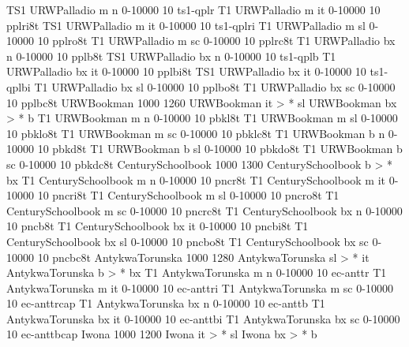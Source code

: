 \declarefont TS1 URWPalladio m   n  0-10000   10 ts1-qplr
\declarefont T1  URWPalladio m   it 0-10000   10 pplri8t
\declarefont TS1 URWPalladio m   it 0-10000   10 ts1-qplri
\declarefont T1  URWPalladio m   sl 0-10000   10 pplro8t
\declarefont T1  URWPalladio m   sc 0-10000   10 pplrc8t
\declarefont T1  URWPalladio bx  n  0-10000   10 pplb8t
\declarefont TS1 URWPalladio bx  n  0-10000   10 ts1-qplb
\declarefont T1  URWPalladio bx  it 0-10000   10 pplbi8t
\declarefont TS1 URWPalladio bx  it 0-10000   10 ts1-qplbi
\declarefont T1  URWPalladio bx  sl 0-10000   10 pplbo8t
\declarefont T1  URWPalladio bx  sc 0-10000   10 pplbc8t
%
%
\declarefontfamily URWBookman 1000 1260
\fontmapshape URWBookman it > * sl
\fontmapseries URWBookman bx > * b
\declarefont T1 URWBookman m   n  0-10000   10 pbkl8t
\declarefont T1 URWBookman m   sl 0-10000   10 pbklo8t
\declarefont T1 URWBookman m   sc 0-10000   10 pbklc8t
\declarefont T1 URWBookman b   n  0-10000   10 pbkd8t
\declarefont T1 URWBookman b   sl 0-10000   10 pbkdo8t
\declarefont T1 URWBookman b   sc 0-10000   10 pbkdc8t
%
%
\declarefontfamily CenturySchoolbook 1000 1300
\fontmapseries CenturySchoolbook b > * bx
\declarefont T1 CenturySchoolbook m   n  0-10000   10 pncr8t
\declarefont T1 CenturySchoolbook m   it 0-10000   10 pncri8t
\declarefont T1 CenturySchoolbook m   sl 0-10000   10 pncro8t
\declarefont T1 CenturySchoolbook m   sc 0-10000   10 pncrc8t
\declarefont T1 CenturySchoolbook bx  n  0-10000   10 pncb8t
\declarefont T1 CenturySchoolbook bx  it 0-10000   10 pncbi8t
\declarefont T1 CenturySchoolbook bx  sl 0-10000   10 pncbo8t
\declarefont T1 CenturySchoolbook bx  sc 0-10000   10 pncbc8t
%
%
\declarefontfamily AntykwaTorunska 1000 1280
\fontmapshape AntykwaTorunska sl > * it
\fontmapseries AntykwaTorunska b > * bx
\declarefont T1 AntykwaTorunska m   n  0-10000   10 ec-anttr
\declarefont T1 AntykwaTorunska m   it 0-10000   10 ec-anttri
\declarefont T1 AntykwaTorunska m   sc 0-10000   10 ec-anttrcap
\declarefont T1 AntykwaTorunska bx  n  0-10000   10 ec-anttb
\declarefont T1 AntykwaTorunska bx  it 0-10000   10 ec-anttbi
\declarefont T1 AntykwaTorunska bx  sc 0-10000   10 ec-anttbcap
%
%
\declarefontfamily Iwona 1000 1200
\fontmapshape Iwona it > * sl
\fontmapseries Iwona bx > * b
